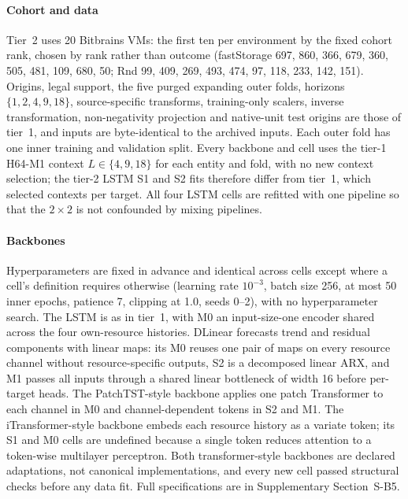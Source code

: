 \documentclass[5p,twocolumn]{elsarticle}
\begin{document}
\paragraph{Cohort and data} Tier~2 uses 20 Bitbrains VMs: the first ten per
environment by the fixed cohort rank, chosen by rank rather than outcome
(fastStorage 697, 860, 366, 679, 360, 505, 481, 109, 680, 50; Rnd 99, 409,
269, 493, 474, 97, 118, 233, 142, 151). Origins, legal support, the five
purged expanding outer folds, horizons $\{1,2,4,9,18\}$, source-specific
transforms, training-only scalers, inverse transformation, non-negativity
projection and native-unit test origins are those of tier~1, and inputs are
byte-identical to the archived inputs. Each outer fold has one inner
training and validation split. Every backbone and cell uses the tier-1 H64-M1
context $L\in\{4,9,18\}$ for each entity and fold, with no new context
selection; the tier-2 LSTM S1 and S2 fits therefore differ from tier~1, which
selected contexts per target. All four LSTM cells are refitted with one
pipeline so that the $2\times2$ is not confounded by mixing pipelines.

\paragraph{Backbones} Hyperparameters are fixed in advance and identical
across cells except where a cell's definition requires otherwise (learning
rate $10^{-3}$, batch size 256, at most 50 inner epochs, patience 7, clipping
at 1.0, seeds 0--2), with no hyperparameter search. The LSTM is as in tier~1,
with M0 an input-size-one encoder shared across the four own-resource
histories. DLinear \citep{Zeng2023DLinear} forecasts trend and residual
components with linear maps: its M0 reuses one pair of maps on every
resource channel without resource-specific outputs, S2 is a decomposed linear
ARX, and M1 passes all inputs through a shared linear bottleneck of width 16
before per-target heads. The PatchTST-style backbone \citep{Nie2023PatchTST}
applies one patch Transformer to each channel in M0 and channel-dependent
tokens in S2 and M1. The iTransformer-style backbone
\citep{Liu2024iTransformer} embeds each resource history as a variate token;
its S1 and M0 cells are undefined because a single token reduces attention to
a token-wise multilayer perceptron. Both transformer-style backbones are
declared adaptations, not canonical implementations, and every new cell
passed structural checks before any data fit. Full specifications are in
Supplementary Section~S-B5.
\end{document}
